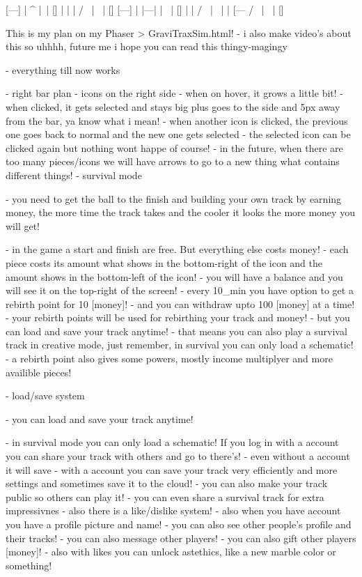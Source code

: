 [---]  |         ^    |\     |  []
|   |  |        / \   | \    |  []
[---]  |       |---|  |  \   |  []
|      |      /    \  |   \  |  
|      [--- /       \ |    \ |  []

This is my plan on my Phaser > GraviTraxSim.html!
- i also make video's about this so uhhhh, future me i hope you can read this thingy-magingy

- everything till now works

- right bar plan {
    - icons on the right side
    - when on hover, it grows a little bit!
    - when clicked, it gets selected and stays big plus goes to the side and 5px away from the bar, ya know what i mean!
    - when another icon is clicked, the previous one goes back to normal and the new one gets selected
    - the selected icon can be clicked again but nothing wont happe of course!
    - in the future, when there are too many pieces/icons we will have arrows to go to a new thing what contains different things!
}
- survival mode {
    - you need to get the ball to the finish and building your own track by earning money, the more time the track takes and the cooler it looks the more money you will get!
    
    - in the game a start and finish are free. But everything else costs money! 
    - each piece costs its amount what shows in the bottom-right of the icon and the amount shows in the bottom-left of the icon!
    - you will have a balance and you will see it on the top-right of the screen!
    - every 10_min you have option to get a rebirth point for 10 [money]!
    - and you can withdraw upto 100 [money] at a time!
    - your rebirth points will be used for rebirthing your track and money!
    - but you can load and save your track anytime!
    - that means you can also play a survival track in creative mode, just remember, in survival you can only load a schematic!
    - a rebirth point also gives some powers, mostly income multiplyer and more availible pieces!
}
- load/save system {
    - you can load and save your track anytime!

    - in survival mode you can only load a schematic! If you log in with a account you can share your track with others and go to there's!
    - even without a account it will save 
    - with a account you can save your track very efficiently and more settings and sometimes save it to the cloud!
    - you can also make your track public so others can play it!
    - you can even share a survival track for extra impressivnes
    - also there is a like/dislike system!
    - also when you have account you have a profile picture and name!
    - you can also see other people's profile and their tracks!
    - you can also message other players!
    - you can also gift other players [money]!
    - also with likes you can unlock astethics, like a new marble color or something!
}
